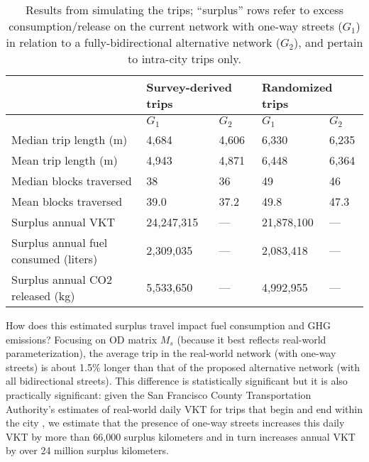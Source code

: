\documentclass{article}
\begin{document}
\begin{table}[tbp]
\centering
\caption{Results from simulating the trips; \enquote{surplus} rows refer to excess consumption/release on the current network with one-way streets ($G_1$) in relation to a fully-bidirectional alternative network ($G_2$), and pertain to intra-city trips only.}
\label{tab:results}
\footnotesize
\begin{tabular}{lllll}
\toprule
& \multicolumn{2}{l}{Survey-derived trips} & \multicolumn{2}{l}{Randomized trips}   \\
\midrule                                         
                                      & $G_1$      & $G_2$  & $G_1$      & $G_2$    \\
\midrule
Median trip length (m)                & 4,684      & 4,606  & 6,330      & 6,235    \\
Mean trip length (m)                  & 4,943      & 4,871  & 6,448      & 6,364    \\
Median blocks traversed               & 38         & 36     & 49         & 46       \\
Mean blocks traversed                 & 39.0       & 37.2   & 49.8       & 47.3     \\
Surplus annual VKT                    & 24,247,315 & ---    & 21,878,100 & ---      \\
Surplus annual fuel consumed (liters) & 2,309,035  & ---    & 2,083,418  & ---      \\
Surplus annual CO2 released (kg)      & 5,533,650  & ---    & 4,992,955  & ---      \\
\bottomrule
\end{tabular}
\end{table}


How does this estimated surplus travel impact fuel consumption and GHG emissions? Focusing on OD matrix $M_s$ (because it best reflects real-world parameterization), the average trip in the real-world network (with one-way streets) is about 1.5\% longer than that of the proposed alternative network (with all bidirectional streets). This difference is statistically significant but it is also practically significant: given the San Francisco County Transportation Authority's estimates of real-world daily VKT for trips that begin and end within the city \citep{san_francisco_county_transportation_authority_tncs_2017}, we estimate that the presence of one-way streets increases this daily VKT by more than 66,000 surplus kilometers and in turn increases annual VKT by over 24 million surplus kilometers.
\end{document}
